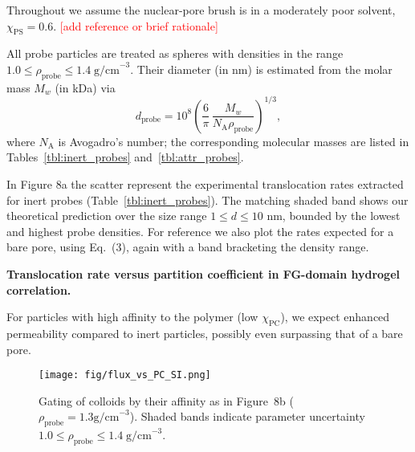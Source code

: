 \documentclass[10pt, a4paper, twocolumn]{article}
\newcommand\todo[1]{\textcolor{red}{#1}}
\begin{document}
Throughout we assume the nuclear-pore brush is in a moderately poor solvent, $\chi_{\text{PS}} = 0.6$. \todo{[add reference or brief rationale]}

All probe particles are treated as spheres with densities in the range $1.0 \le \rho_{\text{probe}} \le 1.4\;\text{g/cm}^{-3}$.  Their
diameter (in nm) is estimated from the molar mass $M_{w}$ (in kDa) via
\begin{equation}
  d_{\text{probe}}
  = 10^{8}
    \left(
      \frac{6}{\pi}\,
      \frac{M_{w}}{N_{\text{A}}\rho_{\text{probe}}}
    \right)^{\!1/3},
  \label{eq:d_probe}
\end{equation}
where $N_{\text{A}}$ is Avogadro's number; the corresponding molecular masses are listed in Tables~\ref{tbl:inert_probes} and~\ref{tbl:attr_probes}.

In Figure 8a the scatter represent the experimental translocation rates extracted for inert probes (Table~\ref{tbl:inert_probes}).
The matching shaded band shows our theoretical prediction over the size range $1 \le d \le 10$ nm, bounded by the lowest and highest probe densities.
For reference we also plot the rates expected for a bare pore, using Eq.~(3), again with a band bracketing the density range.




\textbf{Translocation rate versus partition coefficient in FG-domain hydrogel correlation.}

For particles with high affinity to the polymer (low $\chi_{\text{PC}}$), we expect enhanced permeability compared to inert particles, possibly even surpassing that of a bare pore.

\begin{figure}[]
    \centering
    \texttt{[image: fig/flux\_vs\_PC\_SI.png]}
    \caption{%
    Gating of colloids by their affinity as in Figure~8b ($\rho_{\text{probe}} =1.3 \text{g/cm}^{-3}$).
    Shaded bands indicate parameter uncertainty $1.0 \le \rho_{\text{probe}} \le 1.4\;\text{g/cm}^{-3}$.
    }
    \label{fig:flux_vs_PC}
\end{figure}
\end{document}
